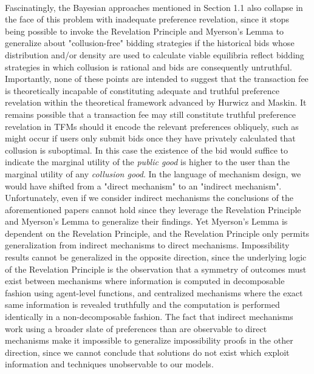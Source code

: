 \documentclass[11pt,a4paper]{llncs}
\begin{document}
\vspace{0.2cm} \\
Fascinatingly, the Bayesian approaches mentioned in Section 1.1 also collapse in the face of this problem with inadequate preference revelation, since it stops being possible to invoke the Revelation Principle and Myerson's Lemma to generalize about "collusion-free" bidding strategies if the historical bids whose distribution and/or density are used to calculate viable equilibria reflect bidding strategies in which collusion is rational and bids are consequently untruthful.
\vspace{0.2cm} \\
Importantly, none of these points are intended to suggest that the transaction fee is theoretically incapable of constituting adequate and truthful preference revelation within the theoretical framework advanced by Hurwicz and Maskin. It remains possible that a transaction fee may still constitute truthful preference revelation in TFMs should it encode the relevant preferences obliquely, such as might occur if users only submit bids once they have privately calculated that collusion is suboptimal. In this case the existence of the bid would suffice to indicate the marginal utility of the \textit{public good} is higher to the user than the marginal utility of any \textit{collusion good}. In the language of mechanism design, we would have shifted from a "direct mechanism" to an "indirect mechanism".
\vspace{0.2cm} \\
Unfortunately, even if we consider indirect mechanisms the conclusions of the aforementioned papers cannot hold since they leverage the Revelation Principle and Myerson's Lemma to generalize their findings. Yet Myerson's Lemma is dependent on the Revelation Principle, and the Revelation Principle only permits generalization from indirect mechanisms to direct mechanisms. Impossibility results cannot be generalized in the opposite direction, since the underlying logic of the Revelation Principle is the observation that a symmetry of outcomes must exist between mechanisms where information is computed in decomposable fashion using agent-level functions, and centralized mechanisms where the exact same information is revealed truthfully and the computation is performed identically in a non-decomposable fashion. The fact that indirect mechanisms work using a broader slate of preferences than are observable to direct mechanisms make it impossible to generalize impossibility proofs in the other direction, since we cannot conclude that solutions do not exist which exploit information and techniques unobservable to our models.
\end{document}
